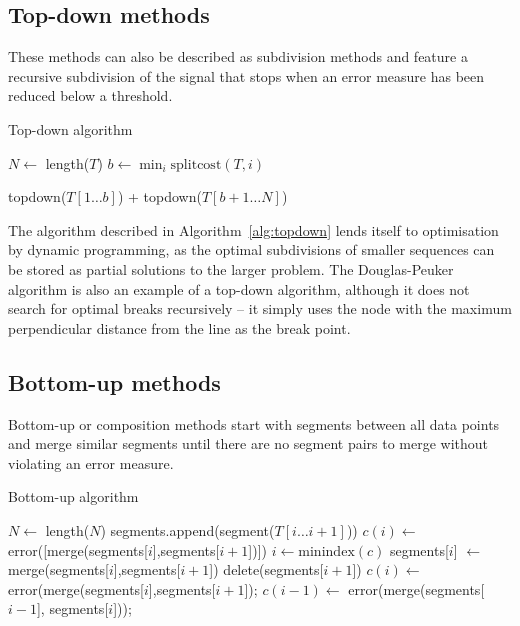 \subsection{Top-down methods}
These methods can also be described as subdivision methods and feature
a recursive subdivision of the signal that stops when an error measure
has been reduced below a threshold.
\begin{algorithm}
  \caption{Top-down algorithm}
  \label{alg:topdown}
  \begin{algorithmic}
       
    \Else
      \State $N \gets $ length($T$)
      \State $b \gets \min_i{\mathrm{splitcost}(T,i)}$ 
  
      \Return topdown($T[1\dots b]$) + topdown($T[b+1\dots N]$) 
      \EndIf
    \EndFunction
\end{algorithmic}
\end{algorithm}
The algorithm described in Algorithm~\ref{alg:topdown} lends itself to
optimisation by dynamic programming, as the optimal subdivisions of
smaller sequences can be stored as partial solutions to the larger
problem.  The Douglas-Peuker algorithm \citep{douglas_algorithms_1973}
is also an example of a top-down algorithm, although it does not
search for optimal breaks recursively -- it simply uses the node with
the maximum perpendicular distance from the line as the break point.

\subsection{Bottom-up methods}
Bottom-up or composition methods start with segments between
all data points and merge similar segments until there are no segment
pairs to merge without violating an error measure.

\begin{algorithm}
  \caption{Bottom-up algorithm}
  \label{alg:bottomup}
  \begin{algorithmic}
    \State $N \gets $ length($N$)
     
    \State segments.append(segment($T[i\dots i+1]$))
    \EndFor
     
    \State $c(i) \gets $error([merge(segments[$i$],segments[$i+1$])])
    \EndFor
    \State $i \gets \mathrm{minindex}(c)$ 
    \State segments[$i$] $\gets$ merge(segments[$i$],segments[$i+1$]) 
    \State delete(segments[$i+1$]) 
    \State $c(i) \gets $error(merge(segments[$i$],segments[$i+1$]); 
    \State $c(i-1) \gets $ error(merge(segments[$i-1$], segments[$i$])); 
    \EndWhile
    \EndFunction
  \end{algorithmic}
\end{algorithm}


